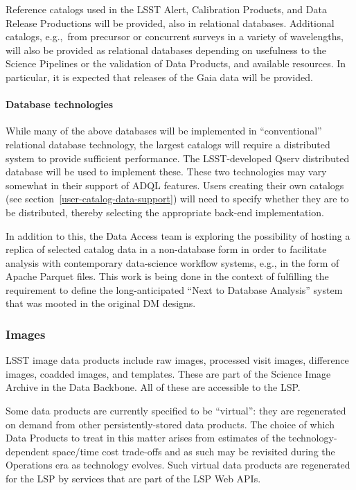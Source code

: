 Reference catalogs used in the LSST Alert, Calibration Products, and Data
Release Productions will be provided, also in relational databases.
Additional catalogs, e.g.,\ from precursor or concurrent surveys in a variety
of wavelengths, will also be provided as relational databases depending on
usefulness to the Science Pipelines or the validation of Data Products,
and available resources.
In particular, it is expected that releases of the Gaia data will be provided.

\paragraph{Database technologies}\label{database-technologies}

While many of the above databases will be implemented in ``conventional''
relational database technology, the largest catalogs will require a distributed
system to provide sufficient performance.
The LSST-developed Qserv distributed database will be used to implement these.
These two technologies may vary somewhat in their support of ADQL features.
Users creating their own catalogs (see section~\ref{user-catalog-data-support})
will need to specify whether they are to be
distributed, thereby selecting the appropriate back-end implementation.

In addition to this, the Data Access team is exploring the possibility of
hosting a replica of selected catalog data in a non-database form in order to
facilitate analysis with contemporary data-science workflow systems, e.g.,
in the form of Apache Parquet files.
This work is being done in the context of fulfilling the requirement to
define the long-anticipated ``Next to Database Analysis'' system that was
mooted in the original DM designs.

\subsubsection{Images}\label{images}

LSST image data products include raw images, processed visit images, difference
images, coadded images, and templates.  These are part of the Science Image
Archive in the Data Backbone.  All of these are accessible to the LSP.

Some data products are currently specified to be ``virtual'': they are
regenerated on demand from other persistently-stored data products.
The choice of which Data Products to treat in this matter arises from
estimates of the technology-dependent space/time cost trade-offs and as
such may be revisited during the Operations era as technology evolves.
Such virtual data products are regenerated for the LSP by services that are
part of the LSP Web APIs.

